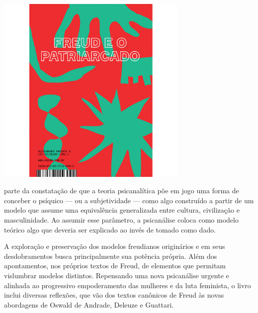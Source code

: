 \pagebreak


\hspace{.5cm}

\begin{center}
\hspace*{.5cm}\includegraphics[width=92mm]{./grid/freud.jpg}
\end{center}

\hspace*{-7cm}\hrulefill\hspace*{-7cm}

\medskip

 parte da constatação de que a teoria psicanalítica põe em jogo uma forma de conceber o psíquico --- ou a subjetividade --- como algo construído a partir de um modelo que assume uma equivalência generalizada entre cultura, civilização e masculinidade. Ao assumir esse parâmetro, a psicanálise coloca como modelo teórico algo que deveria ser explicado ao invés de tomado como dado.

A exploração e preservação dos modelos freudianos originários e em seus desdobramentos busca principalmente sua potência própria. Além dos apontamentos, nos próprios textos de Freud, de elementos que permitam vislumbrar modelos distintos. Repensando uma nova psicanálise urgente e alinhada ao progressivo empoderamento das mulheres e da luta feminista, o livro inclui diversas reflexões, que vão dos textos canônicos de Freud às novas abordagens de Oswald de Andrade, Deleuze e Guattari.

\vfill

